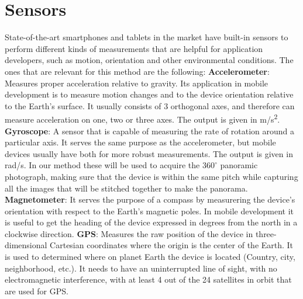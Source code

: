 \section{Sensors}
State-of-the-art smartphones and tablets in the market have built-in sensors to perform different kinds of measurements that are helpful for application developers, such as motion, orientation and other environmental conditions. The ones that are relevant for this method are the following:\newline
\textbf{Accelerometer}: Measures proper acceleration relative to gravity. Its application in mobile development is to measure motion changes and to the device orientation relative to the Earth's surface. It usually consists of 3 orthogonal axes, and therefore can measure acceleration on one, two or three axes. The output is given in m/s\textsuperscript{2}. \newline
\textbf{Gyroscope}: A sensor that is capable of measuring the rate of rotation around a particular axis. It serves the same purpose as the accelerometer, but mobile devices usually have both for more robust measurements. The output is given in rad/s. In our method these will be used to acquire the $360^{\circ}$  panoramic photograph, making sure that the device is within the same pitch while capturing all the images that will be stitched together to make the panorama. \newline
\textbf{Magnetometer}: It serves the purpose of a compass by measurering the device's orientation with respect to the Earth's magnetic poles. In mobile development it is useful to get the heading of the device expressed in degrees from the north in a clockwise direction.\newline
\textbf{GPS}: Measures the raw position of the device in three-dimensional Cartesian coordinates where the origin is the center of the Earth. It is used to determined where on planet Earth the device is located (Country, city, neighborhood, etc.). It needs to have an uninterrupted line of sight, with no electromagnetic interference, with at least 4 out of the 24 satellites in orbit that are used for GPS.

